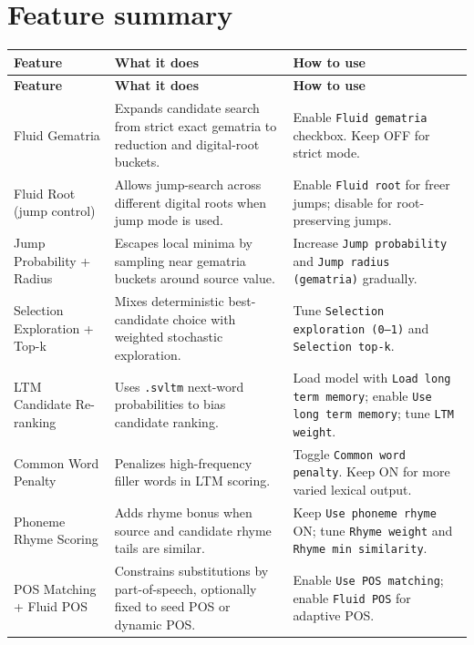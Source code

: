\documentclass[11pt,a4paper]{report}
\begin{document}
\section{Feature summary}
\begin{longtable}{>{\raggedright\arraybackslash}p{} >{\raggedright\arraybackslash}p{} >{\raggedright\arraybackslash}p{}}
\toprule
\textbf{Feature} & \textbf{What it does} & \textbf{How to use} \\
\midrule
\endfirsthead
\toprule
\textbf{Feature} & \textbf{What it does} & \textbf{How to use} \\
\midrule
\endhead

Fluid Gematria & Expands candidate search from strict exact gematria to reduction and digital-root buckets. & Enable \texttt{Fluid gematria} checkbox. Keep OFF for strict mode. \\

Fluid Root (jump control) & Allows jump-search across different digital roots when jump mode is used. & Enable \texttt{Fluid root} for freer jumps; disable for root-preserving jumps. \\

Jump Probability + Radius & Escapes local minima by sampling near gematria buckets around source value. & Increase \texttt{Jump probability} and \texttt{Jump radius (gematria)} gradually. \\

Selection Exploration + Top-k & Mixes deterministic best-candidate choice with weighted stochastic exploration. & Tune \texttt{Selection exploration (0--1)} and \texttt{Selection top-k}. \\

LTM Candidate Re-ranking & Uses \texttt{.svltm} next-word probabilities to bias candidate ranking. & Load model with \texttt{Load long term memory}; enable \texttt{Use long term memory}; tune \texttt{LTM weight}. \\

Common Word Penalty & Penalizes high-frequency filler words in LTM scoring. & Toggle \texttt{Common word penalty}. Keep ON for more varied lexical output. \\

Phoneme Rhyme Scoring & Adds rhyme bonus when source and candidate rhyme tails are similar. & Keep \texttt{Use phoneme rhyme} ON; tune \texttt{Rhyme weight} and \texttt{Rhyme min similarity}. \\

POS Matching + Fluid POS & Constrains substitutions by part-of-speech, optionally fixed to seed POS or dynamic POS. & Enable \texttt{Use POS matching}; enable \texttt{Fluid POS} for adaptive POS. \\


\end{longtable}
\end{document}
